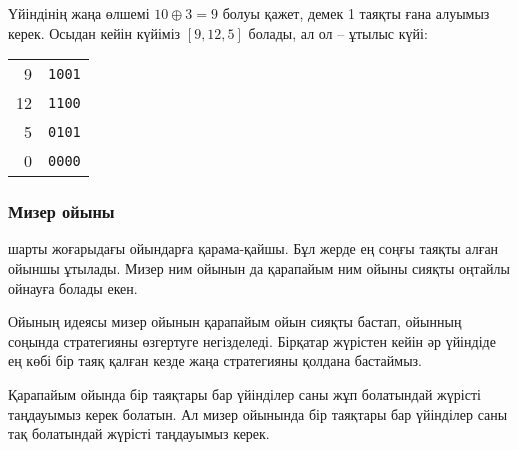 Үйіндінің жаңа өлшемі $10 \oplus 3 = 9$ болуы
қажет, демек 1 таяқты ғана алуымыз керек. 
Осыдан кейін күйіміз $[9,12,5]$ болады,
ал ол -- ұтылыс күйі:


\begin{center}
\begin{tabular}{r|r}
9 & \texttt{1001} \\
12 & \texttt{1100} \\
5 & \texttt{0101} \\
\hline
0 & \texttt{0000} \\
\end{tabular}
\end{center}

\subsubsection{Мизер ойыны}


 шарты жоғарыдағы ойындарға қарама-қайшы. Бұл жерде
ең соңғы таяқты алған ойыншы ұтылады. 
Мизер ним ойынын да қарапайым ним ойыны сияқты 
оңтайлы ойнауға болады екен. 


Ойының идеясы мизер ойынын қарапайым ойын сияқты бастап,
ойынның соңында стратегияны өзгертуге негізделеді. Бірқатар жүрістен кейін 
әр үйіндіде ең көбі бір таяқ қалған кезде жаңа 
стратегияны қолдана бастаймыз. 


Қарапайым ойында бір таяқтары бар үйінділер саны жұп болатындай 
жүрісті таңдауымыз керек болатын. Ал мизер ойынында 
бір таяқтары бар үйінділер саны тақ болатындай 
жүрісті таңдауымыз керек.


